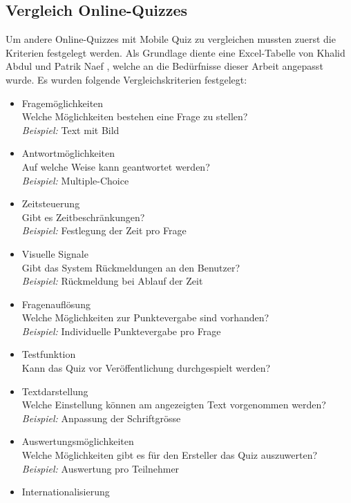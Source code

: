 	\subsection{Vergleich Online-Quizzes}
	\label{subsec:Webuntersuchungen}
	Um andere Online-Quizzes mit Mobile Quiz zu vergleichen mussten zuerst die Kriterien festgelegt werden. Als Grundlage diente eine Excel-Tabelle von Khalid Abdul und Patrik Naef , welche an die Bedürfnisse dieser Arbeit angepasst wurde. Es wurden folgende Vergleichskriterien festgelegt:
	\begin{itemize}
		\item Fragemöglichkeiten \\
		Welche Möglichkeiten bestehen eine Frage zu stellen? \\
		\textit{Beispiel:} Text mit Bild
		\item Antwortmöglichkeiten \\
		Auf welche Weise kann geantwortet werden? \\
		\textit{Beispiel:} Multiple-Choice
		\item Zeitsteuerung \\
		Gibt es Zeitbeschränkungen? \\
		\textit{Beispiel:} Festlegung der Zeit pro Frage
		\item Visuelle Signale \\
		Gibt das System Rückmeldungen an den Benutzer? \\
		\textit{Beispiel:} Rückmeldung bei Ablauf der Zeit
		\item Fragenauflösung \\
		Welche Möglichkeiten zur Punktevergabe sind vorhanden? \\
		\textit{Beispiel:} Individuelle Punktevergabe pro Frage
		\item Testfunktion \\
		Kann das Quiz vor Veröffentlichung durchgespielt werden? \\
		\item Textdarstellung \\
		Welche Einstellung können am angezeigten Text vorgenommen werden? \\
		\textit{Beispiel:} Anpassung der  Schriftgrösse
		\item Auswertungsmöglichkeiten \\
		Welche Möglichkeiten gibt es für den Ersteller das Quiz auszuwerten? \\
		\textit{Beispiel:} Auswertung pro Teilnehmer
		\item Internationalisierung \\

\end{itemize}
